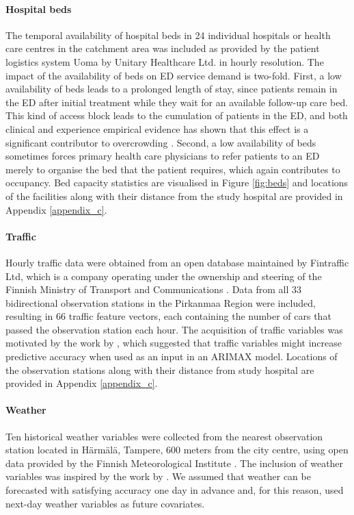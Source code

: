 \paragraph{Hospital beds} The temporal availability of hospital beds in 24 individual hospitals or health care centres in the catchment area was included as provided by the patient logistics system Uoma\textsuperscript{\textregistered} by Unitary Healthcare Ltd. in hourly resolution. The impact of the availability of beds on ED service demand is two-fold. First, a low availability of beds leads to a prolonged length of stay, since patients remain in the ED after initial treatment while they wait for an available follow-up care bed. This kind of access block leads to the cumulation of patients in the ED, and both clinical and experience empirical evidence has shown that this effect is a significant contributor to overcrowding \cite{Morley2018}. Second, a low availability of beds sometimes forces primary health care physicians to refer patients to an ED merely to organise the bed that the patient requires, which again contributes to occupancy. Bed capacity statistics are visualised in Figure \ref{fig:beds} and locations of the facilities along with their distance from the study hospital are provided in Appendix \ref{appendix_c}.

\paragraph{Traffic} Hourly traffic data were obtained from an open database maintained by Fintraffic Ltd, which is a company operating under the ownership and steering of the Finnish Ministry of Transport and Communications \cite{Digitraffic}. Data from all 33 bidirectional observation stations in the Pirkanmaa Region were included, resulting in 66 traffic feature vectors, each containing the number of cars that passed the observation station each hour. The acquisition of traffic variables was motivated by the work by \citet{Rauch2019}, which suggested that traffic variables might increase predictive accuracy when used as an input in an ARIMAX model. Locations of the observation stations along with their distance from study hospital are provided in Appendix \ref{appendix_c}.

\paragraph{Weather} Ten historical weather variables were collected from the nearest observation station located in Härmälä, Tampere, 600 meters from the city centre, using open data provided by the Finnish Meteorological Institute \cite{FMI}. The inclusion of weather variables was inspired by the work by \citet{Whitt2019}. We assumed that weather can be forecasted with satisfying accuracy one day in advance and, for this reason, used next-day weather variables as future covariates. 

